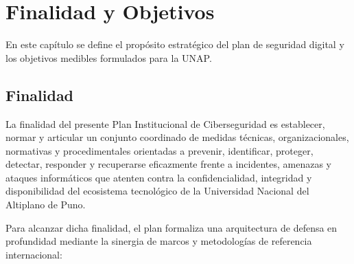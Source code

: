 \chapter{Finalidad y Objetivos}
\label{ch:finalidad_objetivos}

En este capítulo se define el propósito estratégico del plan de seguridad digital y los objetivos medibles formulados para la UNAP.

\section{Finalidad}

La finalidad del presente Plan Institucional de Ciberseguridad es establecer, normar y articular un conjunto coordinado de medidas técnicas, organizacionales, normativas y procedimentales orientadas a prevenir, identificar, proteger, detectar, responder y recuperarse eficazmente frente a incidentes, amenazas y ataques informáticos que atenten contra la confidencialidad, integridad y disponibilidad del ecosistema tecnológico de la Universidad Nacional del Altiplano de Puno.

Para alcanzar dicha finalidad, el plan formaliza una arquitectura de defensa en profundidad mediante la sinergia de marcos y metodologías de referencia internacional:

